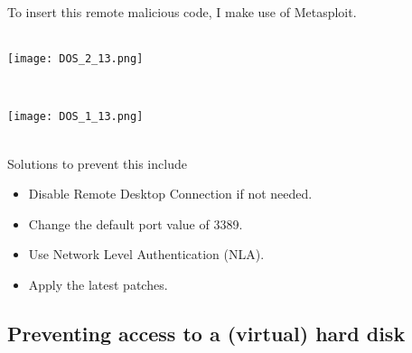 To insert this remote malicious code, I make use of Metasploit.
$\;$ \\ \\
\noindent\begin{minipage}{\textwidth}
    \centering
    \texttt{[image: DOS\_2\_13.png]}
\end{minipage}
$\;$ \\ \\
\noindent\begin{minipage}{\textwidth}
    \centering
    \texttt{[image: DOS\_1\_13.png]}
\end{minipage}
$\;$ \\ \\
Solutions to prevent this include
\begin{itemize}
\item Disable Remote Desktop Connection if not needed.
\item Change the default port value of 3389.
\item Use Network Level Authentication (NLA).
\item Apply the latest patches.
\end{itemize}

\subsection{Preventing access to a (virtual) hard disk}


